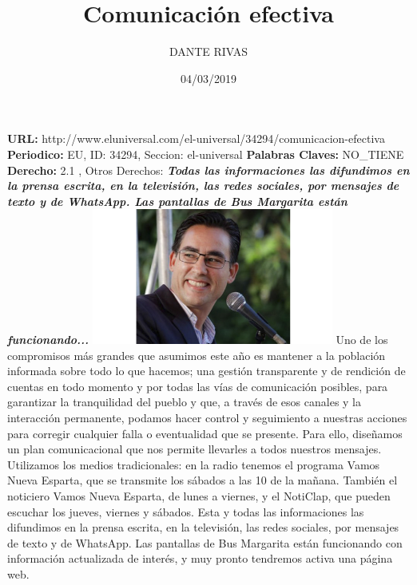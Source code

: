 \documentclass{article}%
\title{\textbf{Comunicación efectiva}}%
\author{DANTE RIVAS}%
\date{04/03/2019}%
\begin{document}
%
\normalsize%
\maketitle%
\textbf{URL: }%
http://www.eluniversal.com/el{-}universal/34294/comunicacion{-}efectiva\newline%
%
\textbf{Periodico: }%
EU, %
ID: %
34294, %
Seccion: %
el{-}universal\newline%
%
\textbf{Palabras Claves: }%
NO\_TIENE\newline%
%
\textbf{Derecho: }%
2.1%
, Otros Derechos: %
\newline%
%
\textbf{\textit{Todas las informaciones las difundimos en la prensa escrita, en la televisión, las redes sociales, por mensajes de texto y de WhatsApp. Las pantallas de Bus Margarita están funcionando...}}%
\newline%
\newline%
%
\includegraphics[width=300px]{EU_34294.jpg}%
\newline%
%
Uno de los compromisos más grandes que asumimos este año es mantener a la población informada sobre todo lo que hacemos; una gestión transparente y de rendición de cuentas en todo momento y por todas las vías de comunicación posibles, para garantizar la tranquilidad del pueblo y que, a través de esos canales y la interacción permanente, podamos hacer control y seguimiento a nuestras acciones para corregir cualquier falla o eventualidad que se presente.%
\newline%
%
Para ello, diseñamos un plan comunicacional que nos permite llevarles a todos nuestros mensajes. Utilizamos los medios tradicionales: en la radio tenemos el programa Vamos Nueva Esparta, que se transmite los sábados a las 10 de la mañana. También el noticiero Vamos Nueva Esparta, de lunes a viernes, y el NotiClap, que pueden escuchar los jueves, viernes y sábados.%
\newline%
%
Esta y todas las informaciones las difundimos en la prensa escrita, en la televisión, las redes sociales, por mensajes de texto y de WhatsApp. Las pantallas de Bus Margarita están funcionando con información actualizada de interés, y muy pronto tendremos activa una página web.%
\end{document}
